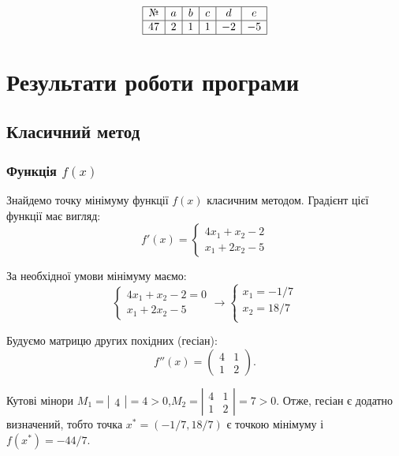 \documentclass[14pt,a4paper]{extarticle}
\theoremstyle{definition}
\renewcommand{\[}{\begin{dmath*}[compact]}
\renewcommand{\]}{\end{dmath*}}
\begin{document}
\[\begin{array}{*6{|c}|}\hline
    \text{№} & a & b & c & d & e \\\hline
    47 & 2 & 1 & 1 & -2 & -5  \\\hline
\end{array}\]

\section{Результати роботи програми}

\subsection{Класичний метод}

\subsubsection{Функція $f(x)$}

Знайдемо точку мінімуму функції $f(x)$ класичним методом.
Градієнт цієї функції має вигляд:\[f'(x)=\left\{\begin{array}{l}4 x_{1} + x_{2} - 2\\x_{1} + 2 x_{2} - 5\end{array}\right.\]

За необхідної умови мінімуму маємо:
\[\left\{\begin{array}{l}4 x_{1} + x_{2} - 2=0\\x_{1} + 2 x_{2} - 5\end{array}\right.\to\left\{\begin{array}{l}x_{1}=-1/7\\x_{2}=18/7\\\end{array}\right.\]

Будуємо матрицю других похідних (гесіан):
\[f''(x)=\left(\begin{matrix}4 & 1\\1 & 2\end{matrix}\right).\]

Кутові мінори $M_1 = \left|\begin{matrix}4\end{matrix}\right| = 4 > 0$,$M_2 = \left|\begin{matrix}4 & 1\\1 & 2\end{matrix}\right| = 7 > 0$. Отже, гесіан є додатно визначений, тобто точка $x^* = \left(-1/7,18/7\right)$ є точкою мінімуму і $f(x^*) = -44/7$.
\end{document}

